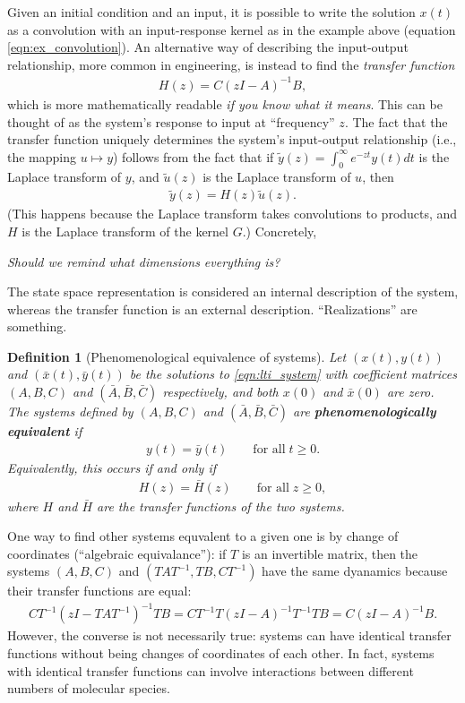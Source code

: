 \documentclass[11 pt]{article}
\newcommand{\plr}[1]{{\color{blue}\it #1}}
\newtheorem{definition}{Definition}
\begin{document}
Given an initial condition and an input, 
it is possible to write the solution $x(t)$
as a convolution with an input-response kernel as in the example above
(equation \eqref{eqn:ex_convolution}).
An alternative way of describing the input-output relationship,
more common in engineering,
is instead to find the \emph{transfer function}
\begin{align} \label{eqn:transfer_fn}
    H(z) = C(z I - A)^{-1} B,
\end{align}
which is more mathematically readable \plr{if you know what it means}.
This can be thought of as the system's response to input at ``frequency'' $z$.
The fact that the transfer function uniquely determines the system's
input-output relationship (i.e., the mapping $u \mapsto y$)
follows from the fact that if $\tilde y(z) = \int_0^\infty e^{-zt} y(t) dt$
is the Laplace transform of $y$,
and $\tilde u(z)$ is the Laplace transform of $u$,
then
\begin{align*}
    \tilde y(z) = H(z) \tilde u(z) .
\end{align*}
(This happens because the Laplace transform takes convolutions to products,
and $H$ is the Laplace transform of the kernel $G$.)
Concretely,

\plr{Should we remind what dimensions everything is?}

The state space representation is considered an internal description of the
system, whereas the transfer function is an external description. 
``Realizations'' are something.

\begin{definition}[Phenomenological equivalence of systems]
    Let $(x(t),y(t))$ and $(\bar x(t),\bar y(t))$ be the solutions to \eqref{eqn:lti_system}
    with coefficient matrices $(A,B,C)$ and $(\bar A,\bar B,\bar C)$ respectively,
    and both $x(0)$ and $\bar x(0)$ are zero. 
    The systems defined by $(A,B,C)$ and $(\bar A,\bar B,\bar C)$ are
    \textbf{phenomenologically equivalent} 
    if
    \begin{align*}
        y(t) = \bar y(t) \qquad \text{for all} \; t \ge 0.
    \end{align*}
    Equivalently, this occurs if and only if
    \begin{align*}
        H(z) = \bar H(z)  \qquad \text{for all} \; z \ge 0,
    \end{align*}
    where $H$ and $\bar H$ are the transfer functions of the two systems.
\end{definition}

One way to find other systems equvalent to a given one
is by change of coordinates (``algebraic equivalance''):
if $T$ is an invertible matrix, then the systems $(A,B,C)$ and $(TAT^{-1},TB,CT^{-1})$
have the same dyanamics because their transfer functions are equal:
\begin{align*}
    CT^{-1}( zI - TAT^{-1})^{-1}TB
    =
    CT^{-1}T( zI - A)^{-1}T^{-1}TB
    =
    C( zI - A)^{-1}B .
\end{align*}
However, the converse is not necessarily true: 
systems can have identical transfer functions without being changes of coordinates of each other.
In fact, systems with identical transfer functions can involve interactions between different
numbers of molecular species.
\end{document}
